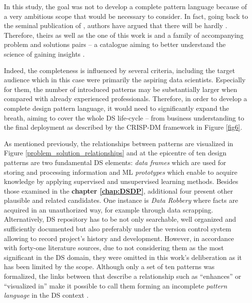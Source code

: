 In this study, the goal was not to develop a complete pattern language because of a very ambitious scope that would be necessary to consider. 
In fact, going back to the seminal publication of \textcite[394]{GoF2002}, authors have argued that there will be hardly . 
Therefore, theirs as well as the one of this work is  and a family of accompanying problem and solutions pairs -- a catalogue aiming to better understand the science of gaining insights \parencites[394]{GoF2002}{Schmidt:1996:SP:236156.236164}.

Indeed, the completeness is influenced by several criteria, including the target audience which in this case were primarily the aspiring data scientists. 
Especially for them, the number of introduced patterns may be substantially larger when compared with already experienced professionals.
Therefore, in order to develop a complete design pattern language, it would need to significantly expand the breath, aiming to cover the whole \ac{DS} life-cycle -- from business understanding to the final deployment as described by the \ac{CRISP-DM} framework in Figure \ref{fig6}.

As mentioned previously, the relationships between patterns are visualized in Figure \ref{problem_solution_relationships} and at the epicentre of ten design patterns are two fundamental \ac{DS} elements: \emph{data frames} which are used for storing and processing information and \ac{ML} \emph{prototypes} which enable to acquire knowledge by applying supervised and unsupervised learning methods.
Besides those examined in the \textbf{chapter \ref{chap:DSDP}}, additional four present other plausible and related candidates.
One instance is \emph{Data Robbery} where facts are acquired in an unauthorized way, for example through data scrapping. 
Alternatively, \ac{DS} repository has to be not only searchable, well organized and sufficiently documented but also preferably under the version control system allowing to record project's history and development. 
However, in accordance with forty-one literature sources, due to not considering them as the most significant in the \ac{DS} domain, they were omitted in this work's deliberation as it has been limited by the scope. 
Although only a set of ten patterns was formalized, the links between that describe a relationship such as \enquote{enhances} or \enquote{visualized in} make it possible to call them forming an incomplete \emph{pattern language} in the \ac{DS} context \parencite{DeardenHCI2006}.

